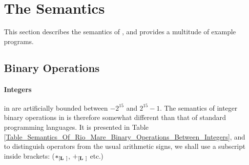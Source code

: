 \documentclass{article}
\begin{document}
\section{The \plname Semantics}
This section describes the semantics of \plname,
and provides a multitude of example programs.
\newpage
\subsection{Binary Operations}
\paragraph{Integers} in \plname are artificially bounded between $-2^{15}$ and $2^{15}-1$.
The semantics of integer binary operations in \plname is therefore somewhat different
than that of standard programming languages.
It is presented in Table \ref{Table_Semantics_Of_Rio_Mare_Binary_Operations_Between_Integers},
and to distinguish \plname operators from the usual arithmetic signs,
we shall use a \plname subscript inside brackets:
($*_{[\textbf{L}\ ]}$, $+_{[\textbf{L}\ ]}$ etc.)
\end{document}
